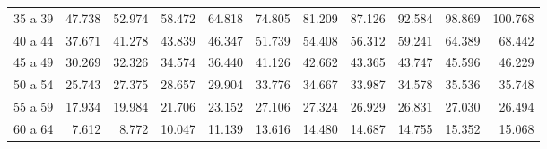 \begin{tabular}{lllllllllll}
\multicolumn{1}{l}{\hspace{1em}35 a 39} &
  \multicolumn{1}{|r}{47.738} &
  \multicolumn{1}{r}{52.974} &
  \multicolumn{1}{r}{58.472} &
  \multicolumn{1}{r}{64.818} &
  \multicolumn{1}{r}{74.805} &
  \multicolumn{1}{r}{81.209} &
  \multicolumn{1}{r}{87.126} &
  \multicolumn{1}{r}{92.584} &
  \multicolumn{1}{r}{98.869} &
  \multicolumn{1}{r}{100.768} \\
\multicolumn{1}{l}{\hspace{1em}40 a 44} &
  \multicolumn{1}{|r}{37.671} &
  \multicolumn{1}{r}{41.278} &
  \multicolumn{1}{r}{43.839} &
  \multicolumn{1}{r}{46.347} &
  \multicolumn{1}{r}{51.739} &
  \multicolumn{1}{r}{54.408} &
  \multicolumn{1}{r}{56.312} &
  \multicolumn{1}{r}{59.241} &
  \multicolumn{1}{r}{64.389} &
  \multicolumn{1}{r}{68.442} \\
\multicolumn{1}{l}{\hspace{1em}45 a 49} &
  \multicolumn{1}{|r}{30.269} &
  \multicolumn{1}{r}{32.326} &
  \multicolumn{1}{r}{34.574} &
  \multicolumn{1}{r}{36.440} &
  \multicolumn{1}{r}{41.126} &
  \multicolumn{1}{r}{42.662} &
  \multicolumn{1}{r}{43.365} &
  \multicolumn{1}{r}{43.747} &
  \multicolumn{1}{r}{45.596} &
  \multicolumn{1}{r}{46.229} \\
\multicolumn{1}{l}{\hspace{1em}50 a 54} &
  \multicolumn{1}{|r}{25.743} &
  \multicolumn{1}{r}{27.375} &
  \multicolumn{1}{r}{28.657} &
  \multicolumn{1}{r}{29.904} &
  \multicolumn{1}{r}{33.776} &
  \multicolumn{1}{r}{34.667} &
  \multicolumn{1}{r}{33.987} &
  \multicolumn{1}{r}{34.578} &
  \multicolumn{1}{r}{35.536} &
  \multicolumn{1}{r}{35.748} \\
\multicolumn{1}{l}{\hspace{1em}55 a 59} &
  \multicolumn{1}{|r}{17.934} &
  \multicolumn{1}{r}{19.984} &
  \multicolumn{1}{r}{21.706} &
  \multicolumn{1}{r}{23.152} &
  \multicolumn{1}{r}{27.106} &
  \multicolumn{1}{r}{27.324} &
  \multicolumn{1}{r}{26.929} &
  \multicolumn{1}{r}{26.831} &
  \multicolumn{1}{r}{27.030} &
  \multicolumn{1}{r}{26.494} \\
\multicolumn{1}{l}{\hspace{1em}60 a 64} &
  \multicolumn{1}{|r}{7.612} &
  \multicolumn{1}{r}{8.772} &
  \multicolumn{1}{r}{10.047} &
  \multicolumn{1}{r}{11.139} &
  \multicolumn{1}{r}{13.616} &
  \multicolumn{1}{r}{14.480} &
  \multicolumn{1}{r}{14.687} &
  \multicolumn{1}{r}{14.755} &
  \multicolumn{1}{r}{15.352} &
  \multicolumn{1}{r}{15.068} \\

\end{tabular}
